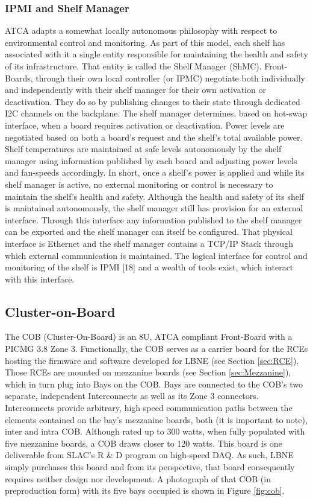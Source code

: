 \subsubsection{IPMI and Shelf Manager}
\label{sec:shelfManager}
ATCA adapts a somewhat locally autonomous philosophy with respect to environmental control and monitoring. As part of this model, each shelf has associated with it a single entity responsible for maintaining the health and safety of its infrastructure. That entity is called the Shelf Manager (ShMC). Front-Boards, through their own local controller (or IPMC) negotiate both individually and independently with their shelf manager for their own activation or deactivation. They do so by publishing changes to their state through dedicated I2C channels on the backplane.
The shelf manager determines, based on hot-swap interface, when a board requires activation or deactivation. Power levels are negotiated based on both a board's request and the shelf's total available power. Shelf temperatures are maintained at safe levels autonomously by the shelf manager using information published by each board and adjusting power levels and fan-speeds accordingly.
In short, once a shelf's power is applied and while its shelf manager is active, no external monitoring or control is necessary to maintain the shelf's health and safety.
Although the health and safety of its shelf is maintained autonomously, the shelf manager still has provision for an external interface. Through this interface any information published to the shelf manager can be exported and the shelf manager can itself be configured. That physical interface is Ethernet and the shelf manager contains a TCP/IP Stack through which external communication is maintained. The logical interface for control and monitoring of the shelf is IPMI [18] and a wealth of tools exist, which interact with this interface.


\subsection{Cluster-on-Board}
\label{sec:COB}
The COB (Cluster-On-Board) is an 8U, ATCA compliant Front-Board with a PICMG 3.8 Zone 3. Functionally, the COB serves as a carrier board for the RCEs hosting the firmware and software developed for LBNE (see Section \ref{sec:RCE}). Those RCEs are mounted on mezzanine boards (see Section \ref{sec:Mezzanine}), which in turn plug into Bays on the COB. Bays are connected to the COB's two separate, independent Interconnects as well as its Zone 3 connectors. Interconnects provide arbitrary, high speed communication paths between the elements contained on the bay's mezzanine boards, both (it is important to note), inter and intra COB.
Although rated up to 300 watts, when fully populated with five mezzanine boards, a COB draws closer to 120 watts. This board is one deliverable from SLAC's R \& D program on high-speed DAQ. As such, LBNE simply purchases this board and from its perspective, that board consequently requires neither design nor development. A photograph of that COB (in preproduction form) with its five bays occupied is shown in Figure \ref{fig:cob}.


